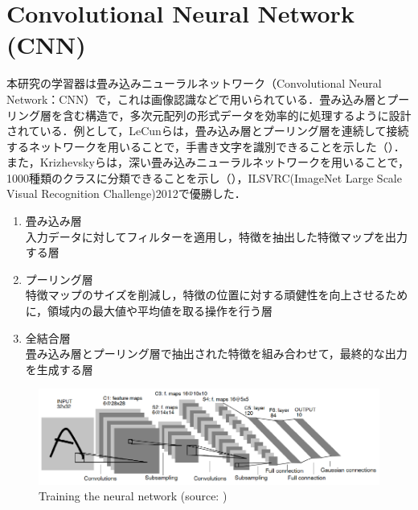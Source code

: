 
\section{Convolutional Neural Network (CNN)}

  本研究の学習器は畳み込みニューラルネットワーク（Convolutional Neural Network：CNN）で，これは画像認識などで用いられている\cite{yann1}\cite{alex}．畳み込み層とプーリング層を含む構造で，多次元配列の形式データを効率的に処理するように設計されている．例として，LeCunら\cite{yann1}は，畳み込み層とプーリング層を連続して接続するネットワークを用いることで，手書き文字を識別できることを示した（）．また，Krizhevskyら\cite{alex}は，深い畳み込みニューラルネットワークを用いることで，1000種類のクラスに分類できることを示し（），ILSVRC(ImageNet Large Scale Visual Recognition Challenge)2012で優勝した．


  \begin{enumerate}
    \item 畳み込み層\\
    入力データに対してフィルターを適用し，特徴を抽出した特徴マップを出力する層
    \item プーリング層\\
    特徴マップのサイズを削減し，特徴の位置に対する頑健性を向上させるために，領域内の最大値や平均値を取る操作を行う層
    \item 全結合層\\
    畳み込み層とプーリング層で抽出された特徴を組み合わせて，最終的な出力を生成する層
  \end{enumerate}

  \begin{figure}[h]
    \centering
    \includegraphics[keepaspectratio, scale=0.70] {images/pdf/yann_CNN}
    \caption[Training the neural network]{Training the neural network (source: \cite{yann1})}
    \label{Fig:yann_CNN}
  \end{figure}

